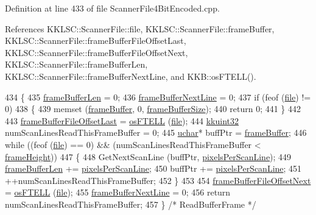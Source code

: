 Definition at line 433 of file Scanner\+File4\+Bit\+Encoded.\+cpp.



References K\+K\+L\+S\+C\+::\+Scanner\+File\+::file, K\+K\+L\+S\+C\+::\+Scanner\+File\+::frame\+Buffer, K\+K\+L\+S\+C\+::\+Scanner\+File\+::frame\+Buffer\+File\+Offset\+Last, K\+K\+L\+S\+C\+::\+Scanner\+File\+::frame\+Buffer\+File\+Offset\+Next, K\+K\+L\+S\+C\+::\+Scanner\+File\+::frame\+Buffer\+Len, K\+K\+L\+S\+C\+::\+Scanner\+File\+::frame\+Buffer\+Next\+Line, and K\+K\+B\+::os\+F\+T\+E\+L\+L().


\begin{DoxyCode}
434 \{
435   \hyperlink{class_k_k_l_s_c_1_1_scanner_file_acaab8b4f6845f11e0a23b0d0e7d62374}{frameBufferLen} = 0;
436   \hyperlink{class_k_k_l_s_c_1_1_scanner_file_a04ad19b685d3d4cd26ddc81a7e0f5d76}{frameBufferNextLine} = 0;
437   \textcolor{keywordflow}{if}  (feof (\hyperlink{class_k_k_l_s_c_1_1_scanner_file_a26db15f7823ce67b1621da17468ec807}{file}) != 0)
438   \{
439     memset (\hyperlink{class_k_k_l_s_c_1_1_scanner_file_ab07c8ac594c6c8324e3078c8d4085633}{frameBuffer}, 0, \hyperlink{class_k_k_l_s_c_1_1_scanner_file_a101cdb2a0320f6aaefcabadc585beb34}{frameBufferSize});
440     \textcolor{keywordflow}{return} 0;
441   \}
442 
443   \hyperlink{class_k_k_l_s_c_1_1_scanner_file_a90c4adfddeadda2794d0b643e5311a2b}{frameBufferFileOffsetLast} = \hyperlink{namespace_k_k_b_a2cc11a5ae09d10d69ad751b549e5d94e}{osFTELL} (\hyperlink{class_k_k_l_s_c_1_1_scanner_file_a26db15f7823ce67b1621da17468ec807}{file});
444   \hyperlink{namespace_k_k_b_af8d832f05c54994a1cce25bd5743e19a}{kkuint32}  numScanLinesReadThisFrameBuffer = 0;
445   \hyperlink{namespace_k_k_b_ace9969169bf514f9ee6185186949cdf7}{uchar}*  buffPtr = \hyperlink{class_k_k_l_s_c_1_1_scanner_file_ab07c8ac594c6c8324e3078c8d4085633}{frameBuffer};
446   \textcolor{keywordflow}{while}  ((feof (\hyperlink{class_k_k_l_s_c_1_1_scanner_file_a26db15f7823ce67b1621da17468ec807}{file}) == 0)  &&  (numScanLinesReadThisFrameBuffer < 
      \hyperlink{class_k_k_l_s_c_1_1_scanner_file_a5598193d137fb79782cc1967ec830625}{frameHeight}))
447   \{
448     GetNextScanLine (buffPtr, \hyperlink{class_k_k_l_s_c_1_1_scanner_file_a07b4ac6b33c35ad0148c7a1422c73cfe}{pixelsPerScanLine});
449     \hyperlink{class_k_k_l_s_c_1_1_scanner_file_acaab8b4f6845f11e0a23b0d0e7d62374}{frameBufferLen} += \hyperlink{class_k_k_l_s_c_1_1_scanner_file_a07b4ac6b33c35ad0148c7a1422c73cfe}{pixelsPerScanLine};
450     buffPtr += \hyperlink{class_k_k_l_s_c_1_1_scanner_file_a07b4ac6b33c35ad0148c7a1422c73cfe}{pixelsPerScanLine};
451     ++numScanLinesReadThisFrameBuffer;
452   \}
453 
454   \hyperlink{class_k_k_l_s_c_1_1_scanner_file_a76318219aaf8142be8a0dfb1705c7430}{frameBufferFileOffsetNext} = \hyperlink{namespace_k_k_b_a2cc11a5ae09d10d69ad751b549e5d94e}{osFTELL} (\hyperlink{class_k_k_l_s_c_1_1_scanner_file_a26db15f7823ce67b1621da17468ec807}{file});
455   \hyperlink{class_k_k_l_s_c_1_1_scanner_file_a04ad19b685d3d4cd26ddc81a7e0f5d76}{frameBufferNextLine} = 0;
456   \textcolor{keywordflow}{return}  numScanLinesReadThisFrameBuffer;
457 \}  \textcolor{comment}{/* ReadBufferFrame */}
\end{DoxyCode}
